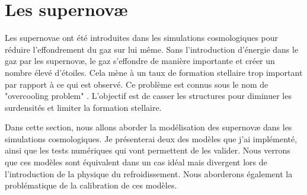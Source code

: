 \clearpage
\section{Les supernovæ}



Les supernovae ont été introduites dans les simulations cosmologiques pour réduire l'effondrement du gaz sur lui même.
Sans l'introduction d'énergie dans le gaz par les supernovæ, le gaz s'effondre de manière importante et créer un nombre élevé d'étoiles.
Cela mène à un taux de formation stellaire trop important par rapport à ce qui est observé.
Ce problème est connus sous le nom de "overcooling problem" \citep{2003ApJ...599...38B, 1992A&A...264..365B}.
L'objectif est de casser les structures pour diminuer les surdensités et limiter la formation stellaire.

Dans cette section, nous allons aborder la modélisation des supernovæ dans les simulations cosmologiques.
Je présenterai deux des modèles que j'ai implémenté, ainsi que les tests numériques qui vont permettent de les valider.
Nous verrons que ces modèles sont équivalent dans un cas idéal mais divergent lors de l'introduction de la physique du refroidissement.
Nous aborderons également la problématique de la calibration de ces modèles.


%
%


